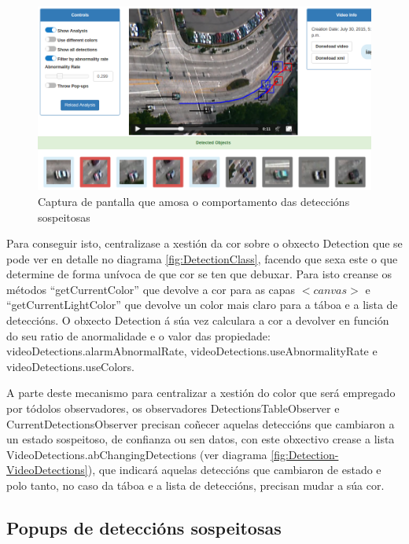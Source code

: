     \begin{figure}[htp]
    \begin{center}
        \includegraphics[scale=0.4]{figures/suspiciousDetections.png}
        \caption{Captura de pantalla que amosa o comportamento das deteccións sospeitosas}
    \label{fig:suspiciousDetections}
    \end{center}
    \end{figure}
    
    Para conseguir isto, centralizase a xestión da cor sobre o obxecto Detection que se pode ver en
    detalle no diagrama \ref{fig:DetectionClass}, facendo que sexa 
    este o que determine de forma unívoca de que cor se ten que debuxar. Para isto creanse os 
    métodos ``getCurrentColor'' que devolve a cor para as capas $<canvas>$ e 
    ``getCurrentLightColor'' que devolve un color mais claro para a táboa e a lista de deteccións.
    O obxecto Detection á súa vez calculara a cor a devolver en función do seu ratio de anormalidade
    e o valor das propiedade: videoDetections.alarmAbnormalRate, videoDetections.useAbnormalityRate
    e videoDetections.useColors.
    
    A parte deste mecanismo para centralizar a xestión do color que será empregado por tódolos 
    observadores, os observadores DetectionsTableObserver e CurrentDetectionsObserver precisan 
    coñecer aquelas deteccións que cambiaron a un estado sospeitoso, de confianza ou sen datos,
    con este obxectivo crease a lista VideoDetections.abChangingDetections (ver diagrama 
    \ref{fig:Detection-VideoDetections}), que indicará aquelas
    deteccións que cambiaron de estado e polo tanto, no caso da táboa e a lista de deteccións, 
    precisan mudar a súa cor.
    
    \subsection{Popups de deteccións sospeitosas}

